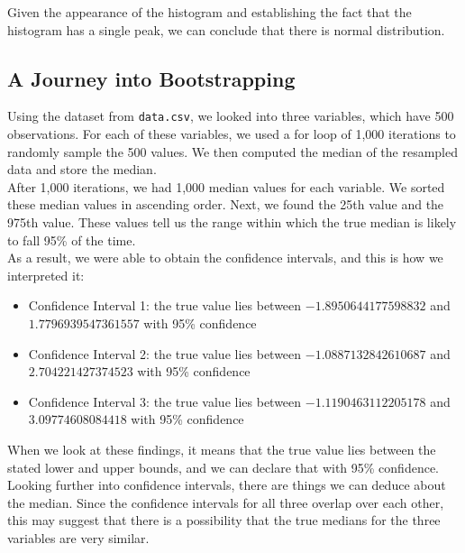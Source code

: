 \documentclass[a4paper,twocolumn]{article}
\begin{document}
Given the appearance of the histogram and establishing the fact that the histogram has a single peak, we can conclude 
that there is normal distribution. \\

\subsection{A Journey into Bootstrapping}
Using the dataset from \texttt{data.csv}, we looked into three variables, which have 500 observations. For each of
these variables, we used a for loop of 1,000 iterations to randomly sample the 500 values. We then computed the median
of the resampled data and store the median. \\

After 1,000 iterations, we had 1,000 median values for each variable. We sorted these median values in ascending 
order. Next, we found the 25th value and the 975th value. These values tell us the range within which the true median
is likely to fall 95\% of the time. \\

As a result, we were able to obtain the confidence intervals, and this is how we interpreted it:
\begin{itemize}
    \item Confidence Interval 1: the true value lies between $-1.8950644177598832$ and $1.7796939547361557$ with 
    95\% confidence
    \item Confidence Interval 2: the true value lies between $-1.0887132842610687$ and $2.704221427374523$ with 
    95\% confidence
    \item Confidence Interval 3: the true value lies between $-1.1190463112205178$ and $3.09774608084418$ with 
    95\% confidence
\end{itemize}

When we look at these findings, it means that the true value lies between the stated lower and upper bounds, and we
can declare that with 95\% confidence. \\

Looking further into confidence intervals, there are things we can deduce about the median. Since the confidence
intervals for all three overlap over each other, this may suggest that there is a possibility that the true medians
for the three variables are very similar. 
\end{document}
